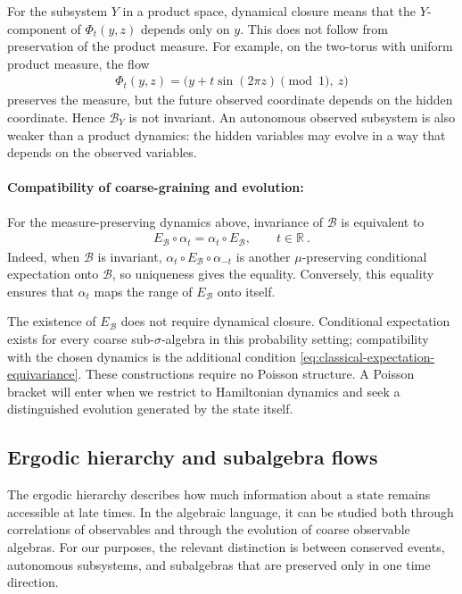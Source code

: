 \documentclass[a4paper,11pt]{article}
\theoremstyle{definition}
\newcommand{\mB}{\mathcal{B}}
\begin{document}
For the subsystem $Y$ in a product space, dynamical closure means that the $Y$-component of $\Phi_t(y,z)$ depends only on $y$. This does not follow from preservation of the product measure. For example, on the two-torus with uniform product measure, the flow
\begin{align}
    \Phi_t(y,z)=\bigl(y+t\sin(2\pi z)\!\!\pmod 1,\ z\bigr)
\end{align}
preserves the measure, but the future observed coordinate depends on the hidden coordinate. Hence $\mB_Y$ is not invariant. An autonomous observed subsystem is also weaker than a product dynamics: the hidden variables may evolve in a way that depends on the observed variables.

\paragraph{Compatibility of coarse-graining and evolution:}
For the measure-preserving dynamics above, invariance of $\mB$ is equivalent to
\begin{align}\label{eq:classical-expectation-equivariance}
    E_{\mB}\circ\alpha_t=\alpha_t\circ E_{\mB},
    \qquad t\in\mathbb R\ .
\end{align}
Indeed, when $\mB$ is invariant, $\alpha_t\circ E_{\mB}\circ\alpha_{-t}$ is another $\mu$-preserving conditional expectation onto $\mB$, so uniqueness gives the equality. Conversely, this equality ensures that $\alpha_t$ maps the range of $E_{\mB}$ onto itself.

The existence of $E_{\mB}$ does not require dynamical closure. Conditional expectation exists for every coarse sub-$\sigma$-algebra in this probability setting; compatibility with the chosen dynamics is the additional condition \eqref{eq:classical-expectation-equivariance}. These constructions require no Poisson structure. A Poisson bracket will enter when we restrict to Hamiltonian dynamics and seek a distinguished evolution generated by the state itself.

\subsection{Ergodic hierarchy and subalgebra flows}
\label{subsec:classical-ergodic-hierarchy}

The ergodic hierarchy describes how much information about a state remains accessible at late times. In the algebraic language, it can be studied both through correlations of observables and through the evolution of coarse observable algebras. For our purposes, the relevant distinction is between conserved events, autonomous subsystems, and subalgebras that are preserved only in one time direction.
\end{document}
